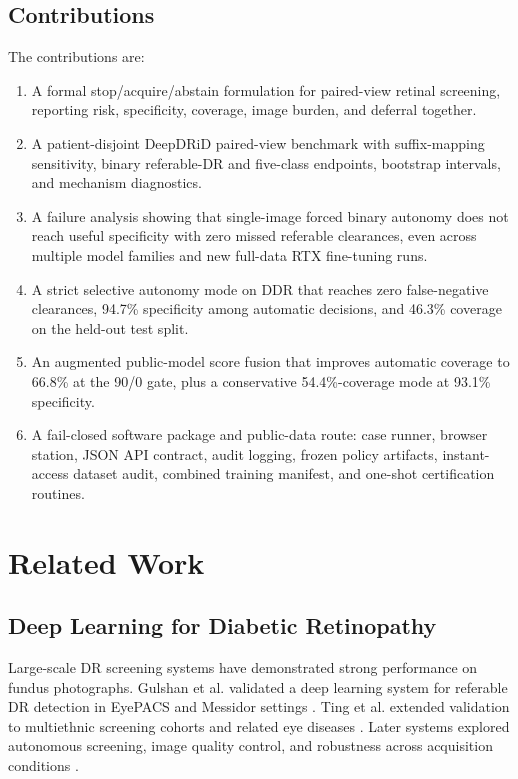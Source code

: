 \documentclass[journal]{IEEEtran}
\begin{document}
\subsection{Contributions}
The contributions are:
\begin{enumerate}
\item A formal stop/acquire/abstain formulation for paired-view retinal screening, reporting risk, specificity, coverage, image burden, and deferral together.
\item A patient-disjoint DeepDRiD paired-view benchmark with suffix-mapping sensitivity, binary referable-DR and five-class endpoints, bootstrap intervals, and mechanism diagnostics.
\item A failure analysis showing that single-image forced binary autonomy does not reach useful specificity with zero missed referable clearances, even across multiple model families and new full-data RTX fine-tuning runs.
\item A strict selective autonomy mode on DDR that reaches zero false-negative clearances, 94.7\% specificity among automatic decisions, and 46.3\% coverage on the held-out test split.
\item An augmented public-model score fusion that improves automatic coverage to 66.8\% at the 90/0 gate, plus a conservative 54.4\%-coverage mode at 93.1\% specificity.
\item A fail-closed software package and public-data route: case runner, browser station, JSON API contract, audit logging, frozen policy artifacts, instant-access dataset audit, combined training manifest, and one-shot certification routines.
\end{enumerate}

\section{Related Work}
\subsection{Deep Learning for Diabetic Retinopathy}
Large-scale DR screening systems have demonstrated strong performance on fundus photographs. Gulshan et al. validated a deep learning system for referable DR detection in EyePACS and Messidor settings \cite{gulshan2016}. Ting et al. extended validation to multiethnic screening cohorts and related eye diseases \cite{ting2017}. Later systems explored autonomous screening, image quality control, and robustness across acquisition conditions \cite{abramoff2018,bellemo2019}.
\end{document}
